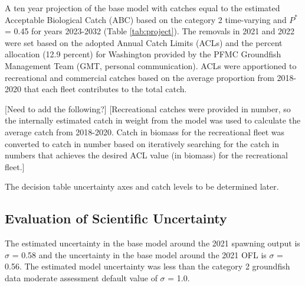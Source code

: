 \documentclass[11pt,
  english,
  a4paper,
]{article}
\begin{document}
\leavevmode\tagmcend\tagstructend


A ten year projection of the base model with catches equal to the estimated Acceptable Biological Catch (ABC) based on the category 2 time-varying and {\(P^*\)\leavevmode\tagmcend\tagstructend} = 0.45 for years 2023-2032 (Table \ref{tab:project}). The removals in 2021 and 2022 were set based on the adopted Annual Catch Limits (ACLs) and the percent allocation (12.9 percent) for Washington provided by the PFMC Groundfish Management Team (GMT, personal communication). ACLs were apportioned to recreational and commercial catches based on the average proportion from 2018-2020 that each fleet contributes to the total catch.

\leavevmode\tagmcend\tagstructend\par


{[}Need to add the following?{]} {[}Recreational catches were provided in number, so the internally estimated catch in weight from the model was used to calculate the average catch from 2018-2020. Catch in biomass for the recreational fleet was converted to catch in number based on iteratively searching for the catch in numbers that achieves the desired ACL value (in biomass) for the recreational fleet.{]}

\leavevmode\tagmcend\tagstructend\par


The decision table uncertainty axes and catch levels to be determined later.

\leavevmode\tagmcend\tagstructend\par


\hypertarget{evaluation-of-scientific-uncertainty}{%
\subsection{Evaluation of Scientific Uncertainty}\label{evaluation-of-scientific-uncertainty}}

\leavevmode\tagmcend\tagstructend


The estimated uncertainty in the base model around the 2021 spawning output is {\(\sigma\)\leavevmode\tagmcend\tagstructend} = 0.58 and the uncertainty in the base model around the 2021 OFL is {\(\sigma\)\leavevmode\tagmcend\tagstructend} = 0.56. The estimated model uncertainty was less than the category 2 groundfish data moderate assessment default value of {\(\sigma\)\leavevmode\tagmcend\tagstructend} = 1.0.
\end{document}
